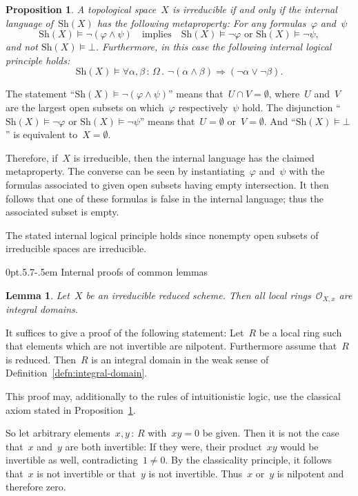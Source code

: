 \documentclass[10pt,reqno,a4paper]{amsbook}
\makeatletter
\theoremstyle{definition}
\theoremstyle{plain}
\newtheorem{prop}[defn]{Proposition}
\newtheorem{lemma}[defn]{Lemma}
\theoremstyle{remark}
\renewcommand{\O}{\mathcal{O}}
\newcommand{\Sh}{\mathrm{Sh}}
\newcommand{\?}{\,{:}\,}
\renewcommand{\_}{\mathpunct{.}\,}
\renewenvironment{proof}[1][\proofname]{\par
  \pushQED{\qed}%
  \normalfont \topsep6\p@\@plus6\p@\relax
  \trivlist
  \item[\hskip\labelsep
        \itshape
    #1\@addpunct{.}]\ignorespaces
}{%
  \popQED\endtrivlist\@endpefalse
}
\def\subsection{\@startsection{subsection}{2}%
  {0pt}{.5\linespacing\@plus.7\linespacing}{-.5em}%
  {\normalfont\bfseries}}
\makeatother
\begin{document}
\begin{prop}\label{prop:irreducibility-internally}
A topological space~$X$ is irreducible if and only if the internal
language of~$\Sh(X)$ has the following metaproperty: For any
formulas~$\varphi$ and~$\psi$
\[ \Sh(X) \models \neg(\varphi \wedge \psi)
  \quad\text{implies}\quad
  \Sh(X) \models \neg\varphi \text{ or }
  \Sh(X) \models \neg\psi, \]
and not $\Sh(X) \models \bot$.
Furthermore, in this case the following internal logical principle holds:
\[ \Sh(X) \models \forall \alpha,\beta \? \Omega\_
  \neg(\alpha \wedge \beta) \Rightarrow (\neg\alpha \vee \neg\beta). \]
\end{prop}
\begin{proof}The statement ``$\Sh(X) \models \neg(\varphi \wedge \psi)$'' means
that~$U \cap V = \emptyset$, where~$U$ and~$V$ are the largest open subsets on
which~$\varphi$ respectively~$\psi$ hold. The disjunction ``$\Sh(X) \models
\neg\varphi$ or $\Sh(X) \models \neg\psi$'' means that~$U = \emptyset$ or~$V =
\emptyset$. And ``$\Sh(X) \models \bot$'' is equivalent to~$X = \emptyset$.

Therefore, if~$X$ is irreducible, then the internal language has the claimed metaproperty. The converse
can be seen by instantiating~$\varphi$ and~$\psi$ with the formulas associated
to given open subsets having empty intersection. It then follows that one of
these formulas is false in the internal language; thus the associated subset is
empty.

The stated internal logical principle holds since nonempty open subsets of irreducible spaces are
irreducible.
\end{proof}


\subsection{Internal proofs of common lemmas}

\begin{lemma}Let~$X$ be an irreducible reduced scheme. Then all local
rings~$\O_{X,x}$ are integral domains.\end{lemma}
\begin{proof}It suffices to give a proof of the following statement: Let~$R$ be
a local ring such that elements which are not invertible are nilpotent. Furthermore
assume that~$R$ is reduced. Then~$R$ is an integral domain in the weak sense of
Definition~\ref{defn:integral-domain}.

This proof may, additionally to the rules of intuitionistic logic, use the
classical axiom stated in Proposition~\ref{prop:irreducibility-internally}.

So let arbitrary elements~$x,y \? R$ with~$xy = 0$ be given. Then it is not the
case that~$x$ and~$y$ are both invertible: If they were, their product~$xy$
would be invertible as well, contradicting~$1 \neq 0$. By the classicality
principle, it follows that~$x$ is not invertible or that~$y$ is not invertible.
Thus~$x$ or~$y$ is nilpotent and therefore zero.
\end{proof}
\end{document}
